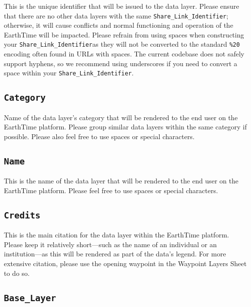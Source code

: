 \documentclass[
]{krantz}
\begin{document}
This is the unique identifier that will be issued to the data layer. Please ensure that there are no other data layers with the same \texttt{Share\_Link\_Identifier}; otherwise, it will cause conflicts and normal functioning and operation of the EarthTime will be impacted. Please refrain from using spaces when constructing your \texttt{Share\_Link\_Identifier}as they will not be converted to the standard \texttt{\%20} encoding often found in URLs with spaces. The current codebase does not safely support hyphens, so we recommend using underscores if you need to convert a space within your \texttt{Share\_Link\_Identifier}.

\hypertarget{category}{%
\subsection*{\texorpdfstring{\texttt{Category}}{Category}}\label{category}}


Name of the data layer's category that will be rendered to the end user on the EarthTime platform. Please group similar data layers within the same category if possible. Please also feel free to use spaces or special characters.

\hypertarget{name}{%
\subsection*{\texorpdfstring{\texttt{Name}}{Name}}\label{name}}


This is the name of the data layer that will be rendered to the end user on the EarthTime platform. Please feel free to use spaces or special characters.

\hypertarget{credits}{%
\subsection*{\texorpdfstring{\texttt{Credits}}{Credits}}\label{credits}}


This is the main citation for the data layer within the EarthTime platform. Please keep it relatively short---such as the name of an individual or an institution---as this will be rendered as part of the data's legend. For more extensive citation, please use the opening waypoint in the Waypoint Layers Sheet to do so.

\hypertarget{base_layer}{%
\subsection*{\texorpdfstring{\texttt{Base\_Layer}}{Base\_Layer}}\label{base_layer}}
\end{document}
